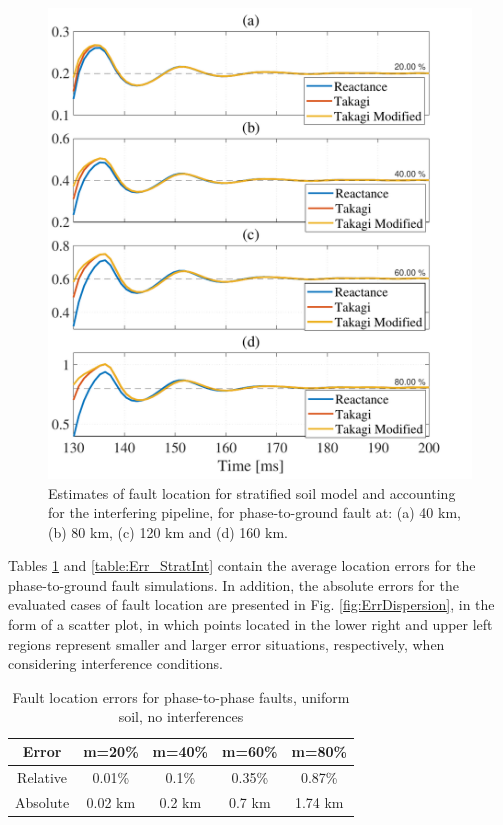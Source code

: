 \documentclass[conference]{IEEEtran}
\begin{document}
\begin{figure}[H]
	\begin{center}
		\includegraphics[width=1.1\columnwidth]{./fig/FaultInterf.pdf}
		\caption{Estimates of fault location for stratified soil model and accounting for the interfering pipeline, for phase-to-ground fault at: (a) 40 km, (b) 80 km, (c) 120 km and (d) 160 km.}
		\label{fig:Conv_StratWithInterf}
	\end{center}
\end{figure}

Tables \ref{table:Err_UnifNoInt} and \ref{table:Err_StratInt} contain the average location errors for the phase-to-ground fault simulations. In addition, the absolute errors for the evaluated cases of fault location are presented in Fig. \ref{fig:ErrDispersion}, in the form of a scatter plot, in which points located in the lower right and upper left regions represent smaller and larger error situations, respectively, when considering interference conditions.

\begin{table}[!hbt]
	\renewcommand{\arraystretch}{1.3}
	\caption{Fault location errors for phase-to-phase faults, uniform soil, no interferences}
	\label{table:Err_UnifNoInt}
	\centering
	\begin{tabular}{|c|c|c|c|c|}
		\hline
		\textbf{Error} & \textbf{m=20\%} & \textbf{m=40\%} & \textbf{m=60\%} & \textbf{m=80\%}\\
		\hline
		Relative & 0.01\% & 0.1\%  & 0.35\%  & 0.87\%\\
		\hline
		Absolute & 0.02 km & 0.2 km & 0.7 km & 1.74 km\\
		\hline
	\end{tabular}
\end{table}
\end{document}
